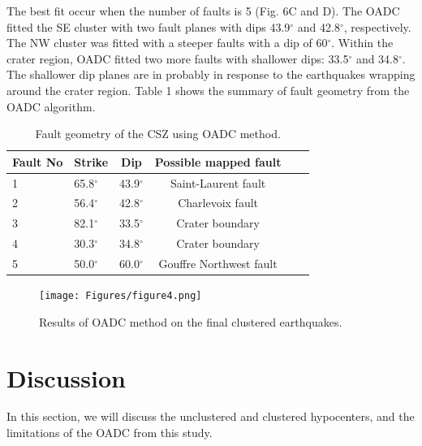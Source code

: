 \documentclass[draft]{agujournal2018}
\begin{document}
The best fit occur when the number of faults is 5 (Fig. 6C and D). The OADC fitted the SE cluster with two fault planes with dips 43.9$^\circ$ and 42.8$^\circ$, respectively. The NW cluster was fitted with a steeper faults with a dip of 60$^\circ$. Within the crater region, OADC fitted two more faults with shallower dips: 33.5$^\circ$ and 34.8$^\circ$. The shallower dip planes are in probably in response to the earthquakes wrapping around the crater region. Table 1 shows the summary of fault geometry from the OADC algorithm.



    \begin{table}
    \caption{Fault geometry of the CSZ using OADC method.}
    \centering
    \begin{tabular}{llcccc}
    \hline
    Fault No & Strike & Dip & Possible mapped fault \\
    \hline
    1 & 65.8$^\circ$ & 43.9$^\circ$ & Saint-Laurent fault \\
    2 & 56.4$^\circ$ & 42.8$^\circ$ & Charlevoix fault \\
    3 & 82.1$^\circ$ & 33.5$^\circ$ & Crater boundary \\
    4 & 30.3$^\circ$ & 34.8$^\circ$ & Crater boundary \\
    5 & 50.0$^\circ$ & 60.0$^\circ$ & Gouffre Northwest fault\\
    \hline
    \end{tabular}
    \label{tableone}
    \end{table}


  \begin{figure}[ht]
\centering
\texttt{[image: Figures/figure4.png]}
\caption{Results of OADC method on the final clustered earthquakes.}
\label{figsix}
\end{figure}



\section{Discussion}
In this section, we will discuss the unclustered and clustered hypocenters, and the limitations of the OADC from this study.
\end{document}
